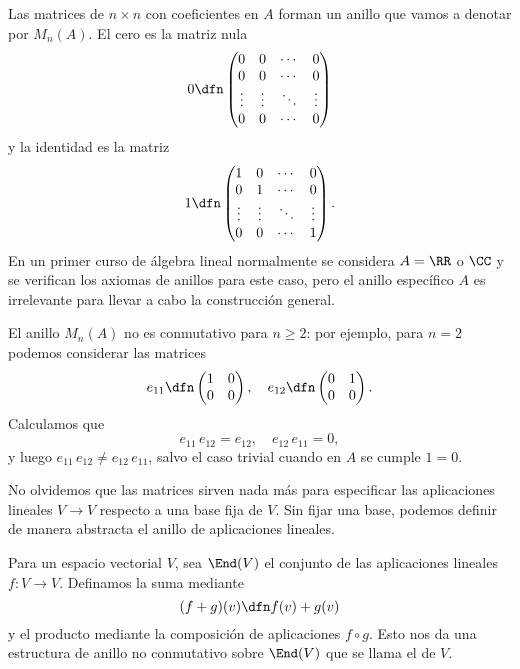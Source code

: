 \begin{ejemplo}
  Las matrices de $n\times n$ con coeficientes en $A$ forman un anillo que vamos
  a denotar por $M_n (A)$. El cero es la matriz nula
  \[ 0 \dfn \begin{pmatrix}
      0 & 0 & \cdots & 0 \\
      0 & 0 & \cdots & 0 \\
      \vdots & \vdots & \ddots & \vdots \\
      0 & 0 & \cdots & 0 \\
    \end{pmatrix} \]
  y la identidad es la matriz
  \[ 1 \dfn \begin{pmatrix}
      1 & 0 & \cdots & 0 \\
      0 & 1 & \cdots & 0 \\
      \vdots & \vdots & \ddots & \vdots \\
      0 & 0 & \cdots & 1 \\
    \end{pmatrix}. \]
  En un primer curso de álgebra lineal normalmente se considera $A = \RR$ o
  $\CC$ y se verifican los axiomas de anillos para este caso, pero el anillo
  específico $A$ es irrelevante para llevar a cabo la construcción general.

  El anillo $M_n (A)$ no es conmutativo para $n \ge 2$: por ejemplo, para
  $n = 2$ podemos considerar las matrices
  \[ e_{11} \dfn \begin{pmatrix}
      1 & 0 \\
      0 & 0
    \end{pmatrix}, \quad
    e_{12} \dfn \begin{pmatrix}
      0 & 1 \\
      0 & 0
    \end{pmatrix}. \]
  Calculamos que
  $$e_{11}\,e_{12} = e_{12}, \quad e_{12}\,e_{11} = 0,$$
  y luego $e_{11}\,e_{12} \ne e_{12}\,e_{11}$, salvo el caso trivial cuando en
  $A$ se cumple $1 = 0$.
\end{ejemplo}

No olvidemos que las matrices sirven nada más para especificar las aplicaciones
lineales $V\to V$ respecto a una base fija de $V$. Sin fijar una base, podemos
definir de manera abstracta el anillo de aplicaciones lineales.

\begin{ejemplo}
  Para un espacio vectorial $V$, sea $\End (V)$ el conjunto de las aplicaciones
  lineales $f\colon V\to V$. Definamos la suma mediante
  $$(f+g) (v) \dfn f (v) + g (v)$$
  y el producto mediante la composición de aplicaciones $f\circ g$. Esto nos da
  una estructura de anillo no conmutativo sobre $\End (V)$ que se llama
  el  de $V$.
\end{ejemplo}

